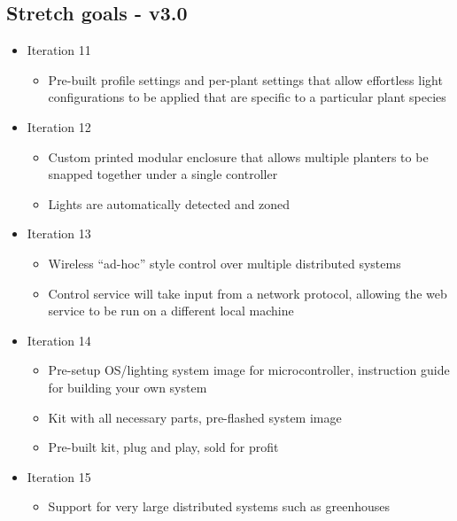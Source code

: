 		\subsection{Stretch goals - v3.0}
			\begin{itemize}
				\item Iteration 11
					\begin{itemize}
						\item Pre-built profile settings and per-plant settings that allow effortless light configurations to be applied that are specific to a particular plant species
					\end{itemize}
				\item Iteration 12
					\begin{itemize}
						\item Custom printed modular enclosure that allows multiple planters to be snapped together under a single controller
						\item Lights are automatically detected and zoned
					\end{itemize}
				\item Iteration 13
					\begin{itemize}
						\item Wireless “ad-hoc” style control over multiple distributed systems
						\item Control service will take input from a network protocol, allowing the web service to be run on a different local machine
					\end{itemize}
				\item Iteration 14
					\begin{itemize}
						\item Pre-setup OS/lighting system image for microcontroller, instruction guide for building your own system
						\item Kit with all necessary parts, pre-flashed system image
						\item Pre-built kit, plug and play, sold for profit
					\end{itemize}
				\item Iteration 15
					\begin{itemize}
						\item Support for very large distributed systems such as greenhouses
					\end{itemize}
			\end{itemize}

